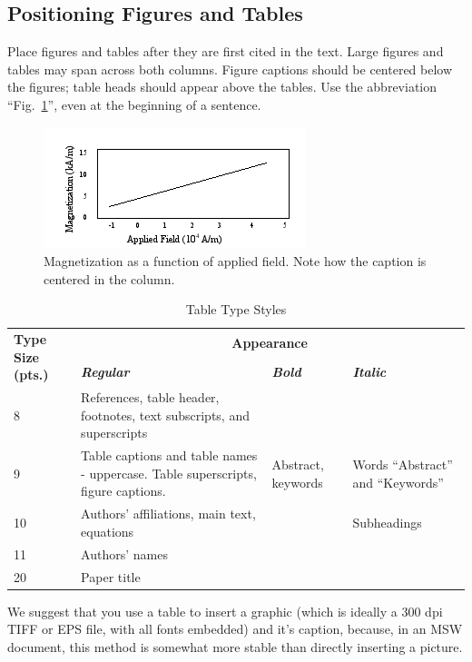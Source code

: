 \documentclass [a4paper,final,conference,10pt]{IDAACS}
\begin{document}
\subsection{Positioning Figures and Tables}

Place figures and tables after they are first cited in the text. Large 
figures and tables may span across both columns. Figure captions should 
be centered below the figures; table heads should appear above the tables. 
Use the abbreviation ``Fig.~\ref{Fig_Magnet}'', even at the beginning of a 
sentence.

\begin{figure}[bth]
\centering
\includegraphics[scale=0.6]{images/Fig1.png}
\caption{\label{Fig_Magnet}Magnetization as a function of applied field. Note 
how the caption is centered in the column.}
\end{figure}

\begin{table}[htb]
\caption{Table Type Styles}
\label{Table_I}
\centering
\begin{tabular}{|p{1.2cm}|p{1.5cm}|p{1.5cm}|p{1.5cm}|}
\hline
\multirow{2}{1.2cm}{\textbf{Type Size (pts.)}} & \multicolumn{3}{|c|}{\textbf{Appearance}}\\
\cline{2-4}
& \textbf{\textit{Regular}}&\textbf{\textit{Bold}}&\textbf{\textit{Italic}}\\
\hline
8 & References, table header, footnotes, text subscripts, and superscripts &&\\
\hline
9 & Table captions and table names - uppercase. Table superscripts, 
figure captions.& Abstract, keywords& Words ``Abstract'' and ``Keywords''\\
\hline 
10 & Authors' affiliations, main text, equations && Subheadings\\
\hline
11 & Authors' names &&\\
\hline
20 & Paper title &&\\
\hline
\end{tabular}
\end{table}

We suggest that you use a table to insert a graphic (which is ideally a 300 dpi
TIFF or EPS file, with all fonts embedded) and it’s caption, because, in an MSW
document, this method is somewhat more stable than directly inserting a picture.
\end{document}
